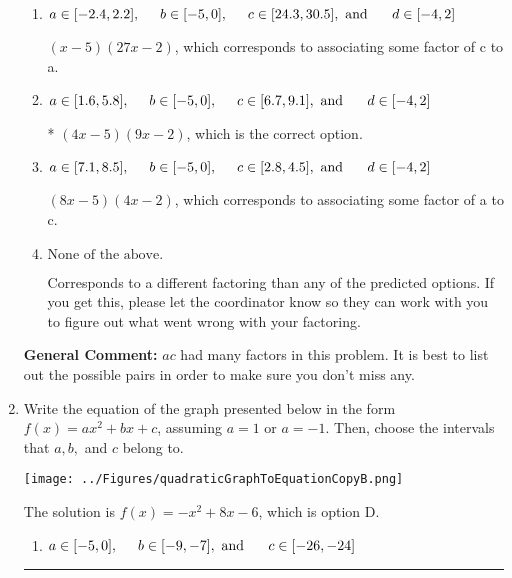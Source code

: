 \documentclass{extbook}[14pt]
\newcommand{\litem}[1]{\item #1

\rule{\textwidth}{0.4pt}}
\begin{document}
\begin{enumerate}
{\begin{enumerate}[label=\Alph*.]
 $(x -45)(x -8)$, which corresponds to factoring $x^{2} -53 x + 360$.
\item \( a \in [-2.4, 2.2], \hspace*{5mm} b \in [-5, 0], \hspace*{5mm} c \in [24.3, 30.5], \text{ and } \hspace*{5mm} d \in [-4, 2] \)

 $(x -5)(27x -2)$, which corresponds to associating some factor of c to a.
\item \( a \in [1.6, 5.8], \hspace*{5mm} b \in [-5, 0], \hspace*{5mm} c \in [6.7, 9.1], \text{ and } \hspace*{5mm} d \in [-4, 2] \)

* $(4x -5)(9x -2)$, which is the correct option.
\item \( a \in [7.1, 8.5], \hspace*{5mm} b \in [-5, 0], \hspace*{5mm} c \in [2.8, 4.5], \text{ and } \hspace*{5mm} d \in [-4, 2] \)

 $(8x -5)(4x -2)$, which corresponds to associating some factor of a to c.
\item \( \text{None of the above.} \)

 Corresponds to a different factoring than any of the predicted options. If you get this, please let the coordinator know so they can work with you to figure out what went wrong with your factoring.
\end{enumerate}

\textbf{General Comment:} $ac$ had many factors in this problem. It is best to list out the possible pairs in order to make sure you don't miss any.
}
\litem{
Write the equation of the graph presented below in the form $f(x)=ax^2+bx+c$, assuming  $a=1$ or $a=-1$. Then, choose the intervals that $a, b,$ and $c$ belong to.

\begin{center}
    \texttt{[image: ../Figures/quadraticGraphToEquationCopyB.png]}
\end{center}


The solution is \( f(x) = -x^{2} +8 x -6 \), which is option D.\begin{enumerate}[label=\Alph*.]
\item \( a \in [-5, 0], \hspace*{5mm} b \in [-9, -7], \text{ and } \hspace*{5mm} c \in [-26, -24] \)


\end{enumerate}}
\end{enumerate}
\end{document}
